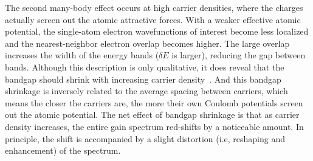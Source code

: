The second many-body effect occurs at high carrier densities, where the charges
actually screen out the atomic attractive forces. With a weaker effective
atomic potential, the single-atom electron wavefunctions of interest become
less localized and the nearest-neighbor electron overlap becomes higher. The
large overlap increases the width of the energy bands ($\delta{E}$ is larger),
reducing the gap between bands. Although this description is only qualitative,
it does reveal that the bandgap should shrink with increasing carrier
density~\cite{coldren2012diode}. And this bandgap shrinkage is inversely
related to the average spacing between carriers, which means the closer the
carriers are, the more their own Coulomb potentials screen out the atomic
potential.  The net effect of bandgap shrinkage is that as carrier density
increases, the entire gain spectrum red-shifts by a noticeable amount.  In
principle, the shift is accompanied by a slight distortion (i.e, reshaping and
enhancement) of the spectrum.
